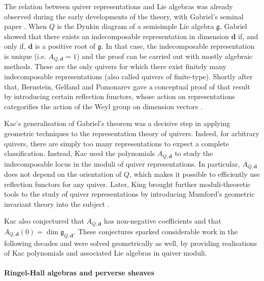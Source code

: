 \documentclass[11pt,english]{article}
\numberwithin{equation}{section}
\numberwithin{figure}{section}
\theoremstyle{definition}
\theoremstyle{plain}
\theoremstyle{remark}
\newcommand\dd{\mathbf{d}}
\begin{document}
The relation between quiver representations and Lie algebras was already
observed during the early developments of the theory, with Gabriel's
seminal paper \cite{Gab72}. When $Q$ is the Dynkin diagram of a
semisimple Lie algebra $\mathfrak{g}$, Gabriel showed that there
exists an indecomposable representation in dimension $\dd$ if, and
only if, $\dd$ is a positive root of $\mathfrak{g}$. In that case,
the indecomposable representation is unique (i.e. $A_{Q,\dd}=1$)
and the proof can be carried out with mostly algebraic methods. These
are the only quivers for which there exist finitely many indecomposable
representations (also called quivers of finite-type). Shortly after
that, Bernstein, Gelfand and Pomonarev gave a conceptual proof of
that result by introducing certain reflection functors, whose action
on representations categorifies the action of the Weyl group on dimension
vectors \cite{BGP73}.

Kac's generalisation of Gabriel's theorem was a decisive step in applying
geometric techniques to the representation theory of quivers. Indeed,
for arbitrary quivers, there are simply too many representations to
expect a complete classification. Instead, Kac used the polynomials
$A_{Q,\dd}$ to study the indecomposable locus in the moduli of quiver
representations. In particular, $A_{Q,\dd}$ does not depend on the
orientation of $Q$, which makes it possible to efficiently use reflection
functors for any quiver. Later, King brought further moduli-theoretic
tools to the study of quiver representations by introducing Mumford's
geometric invariant theory into the subject \cite{Kin94}.

Kac also conjectured that $A_{Q,\dd}$ has non-negative coefficients
and that $A_{Q,\dd}(0)=\dim\mathfrak{g}_{Q,\dd}$. These conjectures
sparked considerable work in the following decades and were solved
geometrically as well, by providing realisations of Kac polynomials
and associated Lie algebras in quiver moduli.

\paragraph*{Ringel-Hall algebras and perverse sheaves}
\end{document}
